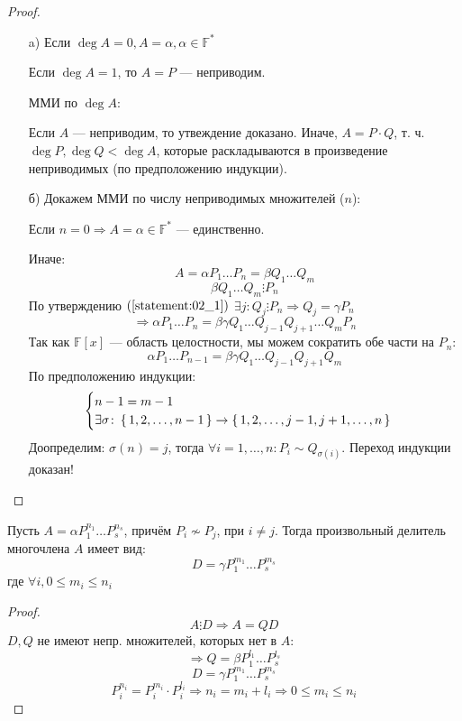\begin{proof}
\begin{itemize}
  \item [a) ] Если $\deg A = 0, A = \alpha, \alpha \in \mathbb{F}^{*}$

    Если $\deg A = 1$, то $A = P$ --- неприводим.

    ММИ по $\deg A$:

    Если $A$ --- неприводим, то утвеждение доказано. Иначе, $A = P \cdot Q$, т. ч. $\deg P, \deg Q < \deg A$, которые раскладываются в произведение неприводимых (по предположению индукции).
  \item [б) ] Докажем ММИ по числу неприводимых множителей ($n$):

    Если $n = 0 \Rightarrow A = \alpha \in \mathbb{F}^{*}$ --- единственно.

    Иначе:
    \[
    A = \alpha P_1 \ldots P_n = \beta Q_1 \ldots Q_m 
    \]
    \[
    \beta Q_1 \ldots Q_m \vdots P_n
    \]
    По утверждению $(\ref{statement:02_1})$ $\exists j \colon Q_j \vdots P_n \Rightarrow Q_j = \gamma P_n$
    \[
    \Rightarrow \alpha P_1 \ldots P_n = \beta \gamma Q_1 \ldots Q_{j - 1}Q_{j + 1}\ldots Q_m P_n
    \]
    Так как $\mathbb{F}[x]$ --- область целостности, мы можем сократить обе части на $P_n$:
    \[
    \alpha P_1 \ldots P_{n - 1} = \beta \gamma Q_1 \ldots Q_{j - 1}Q_{j + 1} Q_m
    \]
    По предположению индукции:
    \[
    \begin{cases}
    n - 1 = m - 1 \\
    \exists \sigma \colon \set{1, 2, \ldots, n - 1} \rightarrow \set{1, 2, \ldots, j - 1, j + 1, \ldots, n}
    \end{cases}
    \]
    Доопределим: $\sigma(n) = j$, тогда $\forall i = 1, \ldots, n \colon P_i \sim Q_{\sigma(i)}$. Переход индукции доказан!
\end{itemize}
\end{proof}
\begin{consequence}
\label{consequence:02_2}
Пусть $A = \alpha P_1^{n_1}\ldots P_s^{n_s}$, причём $P_i \not\sim P_j$, при $ i \neq j$. Тогда произвольный делитель многочлена $A$ имеет вид:
\[
  D = \gamma P_1^{m_1}\ldots P_s^{m_s}
\]
где $\forall i, 0 \leq m_i \leq n_i$
\end{consequence}
\begin{proof}
\[
A \vdots D \Rightarrow A = Q D
\]
$D, Q$ не имеют непр. множителей, которых нет в $A$:
\[
\Rightarrow Q = \beta P_1^{l_1}\ldots P_s^{l_s}
\]
\[
  D = \gamma P_1^{m_1} \ldots P_s^{m_s}
\]
\[
 P_{i}^{n_i} = P_i ^{m_i} \cdot P_i^{l_i} \Rightarrow n_i = m_i + l_i \Rightarrow 0 \leq m_i \leq n_i
\]
\end{proof}

